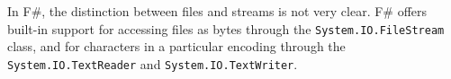 \documentclass[fsharpNotes.tex]{subfiles}
\begin{document}

In F\#, the distinction between files and streams is not very clear. F\# offers built-in support for accessing files as bytes through the \lstinline!System.IO.FileStream! class, and for characters in a particular encoding through the \lstinline!System.IO.TextReader! and \lstinline!System.IO.TextWriter!.
\end{document}
